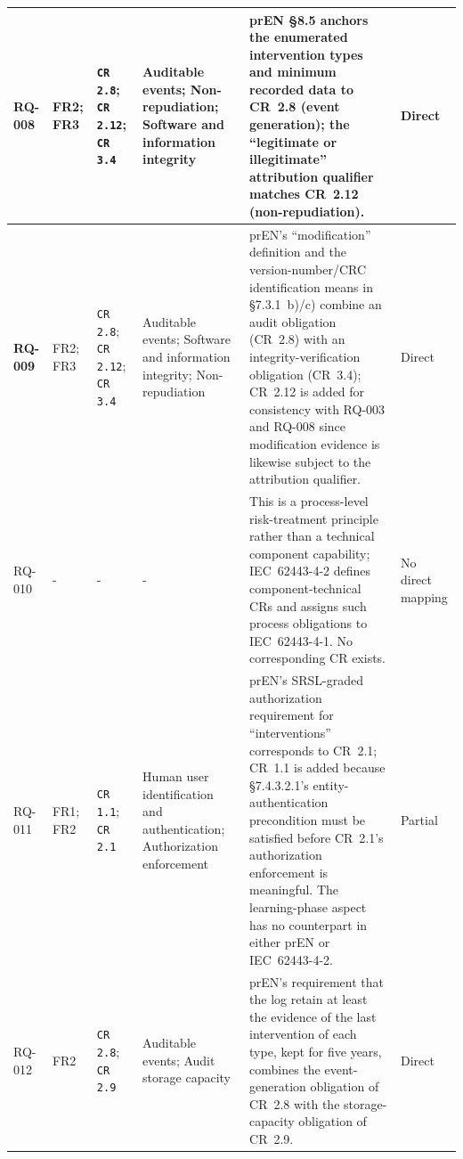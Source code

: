 \begin{longtable}{|>{\bfseries}p{1.0cm}|p{0.9cm}|p{2.4cm}|p{2.4cm}|p{4.8cm}|p{1.2cm}|}
	RQ-008 &
	FR2; FR3 &
	\texttt{CR 2.8};  \newline \texttt{CR 2.12}; \newline  \texttt{CR 3.4} &
	Auditable events; Non-repudiation; Software and information integrity &
	prEN \S8.5 anchors the enumerated intervention types and minimum recorded data to CR~2.8 (event generation); the ``legitimate or illegitimate'' attribution qualifier matches CR~2.12 (non-repudiation). &
	Direct \\
	\hline
	
	RQ-009 &
	FR2; FR3 &
	\texttt{CR 2.8}; \newline  \texttt{CR 2.12}; \newline \texttt{CR 3.4} &
	Auditable events; Software and information integrity; Non-repudiation &
	prEN's ``modification'' definition and the version-number/CRC identification means in \S7.3.1~b)/c) combine an audit obligation (CR~2.8) with an integrity-verification obligation (CR~3.4); CR~2.12 is added for consistency with RQ-003 and RQ-008 since modification evidence is likewise subject to the attribution qualifier. &
	Direct \\
	\hline
	
	RQ-010 &
	- &
	- &
	- &
	This is a process-level risk-treatment principle rather than a technical component capability; IEC~62443-4-2 defines component-technical CRs and assigns such process obligations to IEC~62443-4-1. No corresponding CR exists. &
	No direct mapping \\
	\hline
	
	RQ-011 &
	FR1; FR2 &
	\texttt{CR 1.1}; \newline \texttt{CR 2.1} &
	Human user identification and authentication; Authorization enforcement &
	prEN's SRSL-graded authorization requirement for ``interventions'' corresponds to CR~2.1; CR~1.1 is added because \S7.4.3.2.1's entity-authentication precondition must be satisfied before CR~2.1's authorization enforcement is meaningful. The learning-phase aspect has no counterpart in either prEN or IEC~62443-4-2. &
	Partial \\
	\hline
	
	RQ-012 &
	FR2 &
	\texttt{CR 2.8}; \newline  \texttt{CR 2.9} &
	Auditable events; Audit storage capacity &
	prEN's requirement that the log retain at least the evidence of the last intervention of each type, kept for five years, combines the event-generation obligation of CR~2.8 with the storage-capacity obligation of CR~2.9. &
	Direct \\
	\hline
	

\end{longtable}
